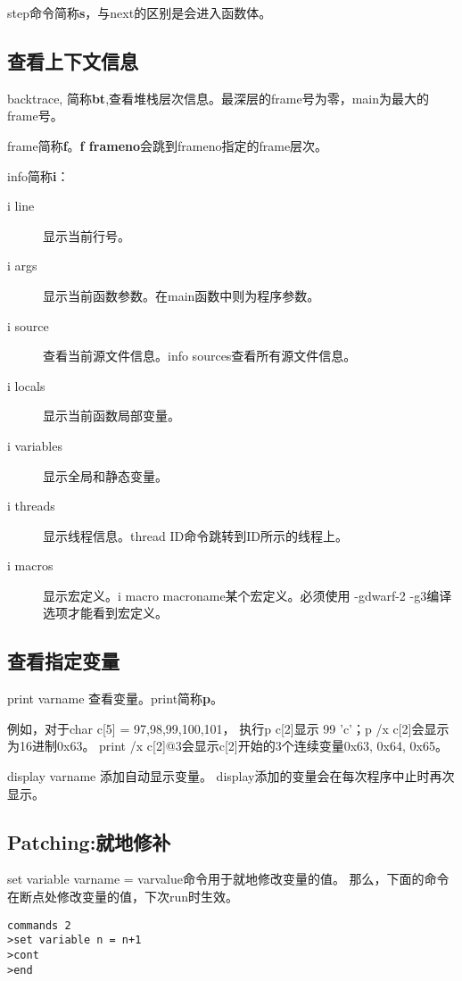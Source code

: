 step命令简称\textbf{s}，与next的区别是会进入函数体。

\subsection{查看上下文信息}

backtrace, 简称\textbf{bt},查看堆栈层次信息。最深层的frame号为零，main为最大的frame号。

frame简称\textbf{f}。\textbf{f frameno}会跳到frameno指定的frame层次。

info简称\textbf{i}：
\begin{description}
    \item[i line]  显示当前行号。
    \item[i args]  显示当前函数参数。在main函数中则为程序参数。
    \item[i source] 查看当前源文件信息。info sources查看所有源文件信息。
    \item[i locals]  显示当前函数局部变量。
    \item[i variables]  显示全局和静态变量。
    \item[i threads]  显示线程信息。thread ID命令跳转到ID所示的线程上。
    \item[i macros]  显示宏定义。i macro macroname某个宏定义。必须使用 -gdwarf-2 -g3编译选项才能看到宏定义。
\end{description}



\subsection{查看指定变量}
print varname 查看变量。print简称\textbf{p}。

例如，对于char c[5] = {97,98,99,100,101}，
执行p c[2]显示 99 'c'；p /x c[2]会显示为16进制0x63。
print /x c[2]@3会显示c[2]开始的3个连续变量{0x63, 0x64, 0x65}。

display varname 添加自动显示变量。
display添加的变量会在每次程序中止时再次显示。

\subsection{Patching:就地修补}
set variable varname = varvalue命令用于就地修改变量的值。
那么，下面的命令在断点处修改变量的值，下次run时生效。
\begin{verbatim}
commands 2
>set variable n = n+1
>cont
>end
\end{verbatim}



